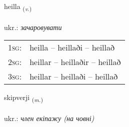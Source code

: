 \documentclass[frontgrid, backgrid]{flacards}\usepackage[]{graphicx}\usepackage[]{xcolor}
\begin{document}
\renewcommand{\blhead}{\vskip5pt {\small\bfseries\footnotesize Sagnorð | дієслово }}
\renewcommand{\bcfoot}{\vskip5pt \hspace{2pt}{\small\bfseries\footnotesize 3K}}


{heilla \small{\textsubscript{(\textit{v.})}} \\[1ex] %
\textphonetic{[heitla]} \\
ukr.: \emph{зачаровувати} \\  [2ex]
\renewcommand*{\arraystretch}{0.8}
\begin{tabular}{p{1cm}l}
\textsc{1sg}: & heilla -- heillaði -- heillað \\ 
\textsc{2sg}: & heillar -- heillaðir -- heillað \\ 
\textsc{3sg}: & heillar -- heillaði -- heillað \\ 
\end{tabular}
}

\renewcommand{\flhead}{\vskip5pt \fboxsep=0pt {\small\bfseries\footnotesize Nafnorð | іменник}}
\renewcommand{\fcfoot}{\vskip5pt \fboxsep=0pt \hspace{2pt}{\small\bfseries\footnotesize 3K}}

\renewcommand{\blhead}{\vskip5pt {\small\bfseries\footnotesize Nafnorð | іменник }}
\renewcommand{\bcfoot}{\vskip5pt \hspace{2pt}{\small\bfseries\footnotesize 3K}}


{skipverji \small{\textsubscript{(\textit{m.})}} \\[1ex] %
\textphonetic{[scɪːpvɛrjɪ]} \\
ukr.: \emph{член екіпажу (на човні)} \\  [2ex]
\renewcommand*{\arraystretch}{0.8}
}
\end{document}
